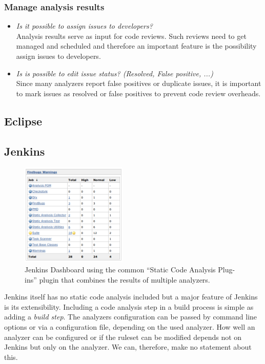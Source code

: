 \documentclass[conference]{IEEEtran}
\begin{document}
\subsubsection{Manage analysis results}
\label{subsubsec:evaluation_manage}
\begin{itemize}
	\item \textit{Is it possible to assign issues to developers?} \\
	Analysis results serve as input for code reviews. Such reviews need to get managed and scheduled and therefore an important feature is the possibility assign issues to developers.
	
	\item \textit{Is is possible to edit issue status? (Resolved, False positive, ...)} \\
	Since many analyzers report false positives or duplicate issues, it is important to mark issues as resolved or false positives to prevent code review overheads.
\end{itemize}


\subsection{Eclipse}
\label{subsec:evaluation_eclipse}

\subsection{Jenkins}
\label{subsec:evaluation_jenkins}

\begin{figure}[t]
	\centering
	\includegraphics[width=0.45\textwidth]{img/jenkins_dashboard.png}
	\caption{Jenkins Dashboard using the common ``Static Code Analysis Plug-ins'' plugin that combines the results of multiple analyzers.}
	\label{fig:jenkins-dashboard}
\end{figure}

Jenkins itself has no static code analysis included but a major feature of Jenkins is its extensibility. Including a code analysis step in a build process is simple as adding a \textit{build step}. The analyzers configuration can be passed by command line options or via a configuration file, depending on the used analyzer. How well an analyzer can be configured or if the ruleset can be modified depends not on Jenkins but only on the analyzer. We can, therefore, make no statement about this.
\end{document}
